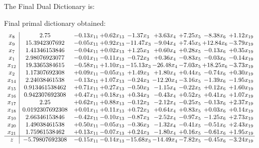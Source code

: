 \documentclass[8pt]{article}
\begin{document}
The Final Dual Dictionary is: 

 Final primal dictionary obtained: 
\[\begin{array}{c| c c@{\hskip 2pt} c@{\hskip 2pt} c@{\hskip 2pt} c@{\hskip 2pt} c@{\hskip 2pt} c@{\hskip 2pt} c@{\hskip 2pt} }
 x_{8}   &  2.75 & -0.13 x_{11} & +  0.62 x_{13} & -1.37 x_{3} & +  3.63 x_{4} & +  7.25 x_{5} & -8.38 x_{6} & +  1.12 x_{19}\\
 x_{9}   &  15.3942307692 & -0.05 x_{11} & +  0.92 x_{13} & -11.47 x_{3} & -9.04 x_{4} & +  7.45 x_{5} & + 12.84 x_{6} & -3.79 x_{19}\\
 x_{7}   &  1.41346153846 & -0.04 x_{11} & +  0.02 x_{13} & +  1.25 x_{3} & +  0.60 x_{4} & +  0.28 x_{5} & -0.13 x_{6} & +  0.35 x_{19}\\
 x_{1}   &  2.98076923077 & -0.01 x_{11} & -0.11 x_{13} & -0.72 x_{3} & +  0.36 x_{4} & -0.83 x_{5} & -0.03 x_{6} & -0.14 x_{19}\\
 x_{12}   &  19.3365384615 & -0.58 x_{11} & +  1.10 x_{13} & -15.13 x_{3} & -26.48 x_{4} & -7.03 x_{5} & + 18.25 x_{6} & -3.73 x_{19}\\
 x_{2}   &  1.17307692308 & +  0.09 x_{11} & -0.05 x_{13} & +  1.49 x_{3} & +  1.80 x_{4} & +  0.44 x_{5} & -0.74 x_{6} & +  0.30 x_{19}\\
 x_{14}   &  2.24038461538 & -0.13 x_{11} & +  1.07 x_{13} & -0.24 x_{3} & -12.20 x_{4} & -3.16 x_{5} & -1.39 x_{6} & -1.95 x_{19}\\
 x_{15}   &  0.913461538462 & +  0.71 x_{11} & +  0.27 x_{13} & -0.50 x_{3} & -1.15 x_{4} & -0.22 x_{5} & +  0.12 x_{6} & +  1.60 x_{19}\\
 x_{16}   &  0.942307692308 & +  0.47 x_{11} & +  0.18 x_{13} & +  0.34 x_{3} & -0.43 x_{4} & +  0.52 x_{5} & +  0.41 x_{6} & +  1.07 x_{19}\\
 x_{17}   &  2.25 & +  0.62 x_{11} & +  0.88 x_{13} & -0.12 x_{3} & -2.12 x_{4} & -0.25 x_{5} & -0.13 x_{6} & +  2.37 x_{19}\\
 x_{18}   &  0.0192307692308 & +  0.01 x_{11} & +  0.11 x_{13} & +  0.72 x_{3} & +  0.64 x_{4} & +  0.83 x_{5} & +  0.03 x_{6} & +  0.14 x_{19}\\
 x_{10}   &  2.66346153846 & -0.42 x_{11} & -0.10 x_{13} & -0.87 x_{3} & -2.52 x_{4} & -0.97 x_{5} & -1.25 x_{6} & +  2.73 x_{19}\\
 x_{20}   &  1.49038461538 & +  0.50 x_{11} & -0.05 x_{13} & -0.36 x_{3} & -1.32 x_{4} & -0.41 x_{5} & -0.51 x_{6} & +  2.43 x_{19}\\
 x_{21}   &  1.75961538462 & +  0.13 x_{11} & -0.07 x_{13} & +  0.24 x_{3} & -1.80 x_{4} & +  0.16 x_{5} & -0.61 x_{6} & +  1.95 x_{19}\\
\hline
z    &  -5.79807692308 & -0.15 x_{11} & -0.14 x_{13} & -15.68 x_{3} & -14.49 x_{4} & -7.82 x_{5} & -0.45 x_{6} & -3.24 x_{19}\\
\end{array}\]
\end{document}

